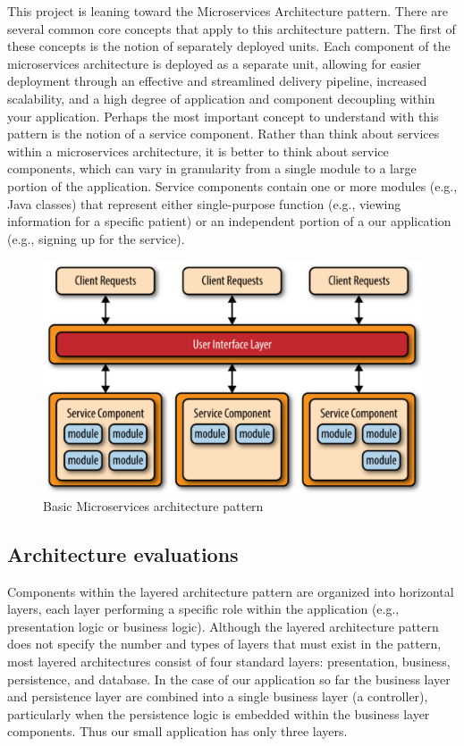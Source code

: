 \documentclass[10pt,oneside]{report}
\begin{document}
This project is leaning toward the Microservices Architecture pattern. There are several common core concepts that apply to this architecture pattern. The first of these concepts is the notion of separately deployed units. Each component of the microservices architecture is deployed as a separate unit, allowing for easier deployment through an effective and streamlined delivery pipeline, increased scalability, and a high degree of application and component decoupling within your application. Perhaps the most important concept to understand with this pattern is the notion of a service component. Rather than think about services within a microservices architecture, it is better to think about service components, which can vary in granularity from a single module to a large portion of the application. Service components contain one or more modules (e.g., Java classes) that represent either single-purpose function (e.g., viewing information for a specific patient) or an independent portion of a our application (e.g., signing up for the service).

\begin{figure}[h!]
\includegraphics[width=15cm]{Basic-Microservices-architecture-pattern.png}
\caption{Basic Microservices architecture pattern}
\label{Basic Microservices architecture pattern}
\end{figure}

\subsection{Architecture evaluations}

Components within the layered architecture pattern are organized into horizontal layers, each layer performing a specific role within the application (e.g., presentation logic or business logic). Although the layered architecture pattern does not specify the number and types of layers that must exist in the pattern, most layered architectures consist of four standard layers: presentation, business, persistence, and database. In the case of our application so far the business layer and persistence layer are combined into a single business layer (a controller), particularly when the persistence logic is embedded within the business layer components. Thus our small application has only three layers.
\end{document}
